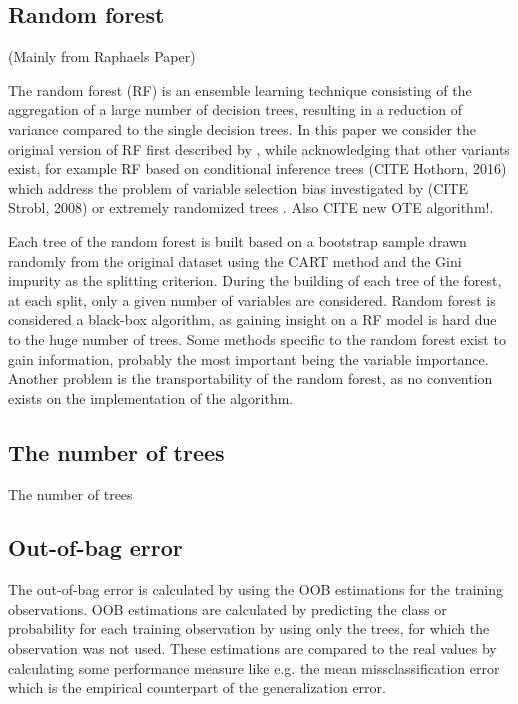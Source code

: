 \documentclass[paper=a4
               ,12pt
               ,DIV=12
               ,parskip=half
               ,titlepage=on
               ,headinclude 
               ,footinclude
               ,headsepline
               ,footsepline         %
               ,ilines 
               ]{scrartcl}
\begin{document}
\subsection{Random forest}

(Mainly from Raphaels Paper)

The random forest (RF) is an ensemble learning technique consisting of the aggregation of a large number of decision 
trees, resulting in a reduction of variance compared to the single decision trees. In this paper we consider the original 
version of RF first described by \citep{Breiman2001}, while acknowledging that other variants exist, for example RF based
on conditional inference trees (CITE Hothorn, 2016) which address the problem of variable selection bias investigated 
by (CITE Strobl, 2008) or extremely randomized trees \citep{Geurts2006}. Also CITE new OTE algorithm!.

Each tree of the random forest is built based on a bootstrap sample drawn randomly from the original dataset using the CART 
method and the Gini impurity as the splitting criterion. During the building of each tree of the forest, at 
each split, only a given number of variables are considered. Random forest is 
considered a black-box algorithm, as gaining insight on a RF model is hard due to the huge number of trees. Some methods 
specific to the random forest exist to gain information, probably the most important being the variable importance. 
Another problem is the transportability of the random forest, as no convention exists on the implementation of the algorithm.

\subsection{The number of trees}
The number of trees

\subsection{Out-of-bag error}

The out-of-bag error is calculated by using the OOB estimations for the training observations. OOB estimations are calculated by predicting the class or probability for each training observation by 
using only the trees, for which the observation was not used. These estimations are compared to the real values by calculating some performance measure like e.g. the mean missclassification error 
which is the empirical counterpart of the generalization error. 
\end{document}
